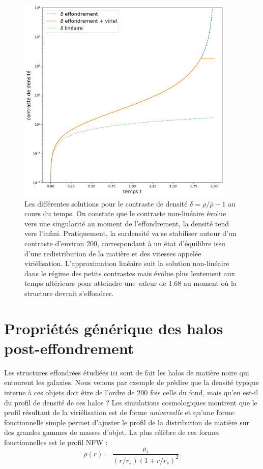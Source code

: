 \begin{figure}[htbp]
	\centering
		\includegraphics[height=10cm]{figs/delta_coll.png}
		\caption[Évolution temporelle du contraste de densité pour l'effondrement sphérique]{
		Les différentes solutions pour le contraste de densité $\delta=\rho/\bar \rho -1$ au cours du temps. On constate que le contraste non-linéaire évolue vers une singularité au moment de l'effondrement, la densité tend vers l'infini. Pratiquement, la surdensité va se stabiliser autour d'un contraste d'environ 200, correspondant à un état d'équilibre issu d'une redistribution de la matière et des vitesses appelée viriélisation. L'approximation linéaire
		 suit la solution non-linéaire dans le régime des petits contrastes mais évolue plus lentement aux temps ultérieurs pour atteindre une valeur de 1.68 au moment où la structure devrait s'effondrer.
		}
	\label{f:dcoll}
\end{figure}


\section{Propriétés générique des halos post-effondrement}
Les structures effondrées étudiées ici sont de fait les halos de matière noire qui entourent les galaxies. Nous venons par exemple de prédire que la densité typique interne à ces objets doit être de l'ordre de 200 fois celle du fond, mais qu'en est-il du profil de densité de ces halos ? Les simulations cosmologiques montrent que le profil résultant de la viriélisation est de forme \textit{ universelle} et qu'une forme fonctionnelle simple permet d'ajuster le profil de la distribution de matière sur des grandes gammes de masses d'objet. La plus célèbre de ces formes fonctionnelles est le profil NFW  : 
\begin{equation}
\rho(r)=\frac{\rho_s}{(r/r_s)(1+r/r_s)^2}.
\end{equation}

